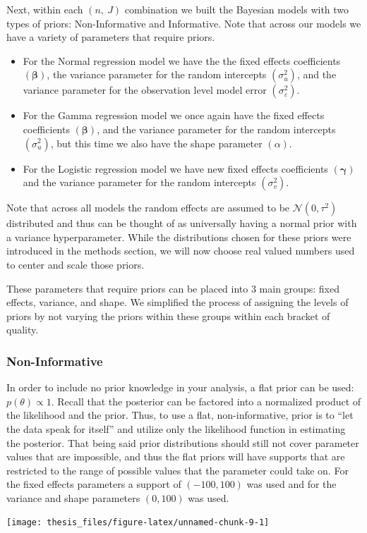 \documentclass[12pt,twoside]{reedthesis}
\begin{document}
Next, within each \((n,\ J)\) combination we built the Bayesian models with two types of priors: Non-Informative and Informative. Note that across our models we have a variety of parameters that require priors.
\begin{itemize}
\item
  For the Normal regression model we have the the fixed effects coefficients \((\boldsymbol{\beta})\), the variance parameter for the random intercepts \((\sigma_u^2)\), and the variance parameter for the observation level model error \((\sigma_{\varepsilon}^2)\).
\item
  For the Gamma regression model we once again have the fixed effects coefficients \((\boldsymbol{\beta})\), and the variance parameter for the random intercepts \((\sigma_u^2)\), but this time we also have the shape parameter \((\alpha)\).
\item
  For the Logistic regression model we have new fixed effects coefficients \((\boldsymbol{\gamma})\) and the variance parameter for the random intercepts \((\sigma_v^2)\).
\end{itemize}
Note that across all models the random effects are assumed to be \(\mathcal{N}(0, \tau^2)\) distributed and thus can be thought of as universally having a normal prior with a variance hyperparameter. While the distributions chosen for these priors were introduced in the methods section, we will now choose real valued numbers used to center and scale those priors.

These parameters that require priors can be placed into 3 main groups: fixed effects, variance, and shape. We simplified the process of assigning the levels of priors by not varying the priors within these groups within each bracket of quality.

\hypertarget{non-informative}{%
\subsubsection{Non-Informative}\label{non-informative}}

In order to include no prior knowledge in your analysis, a flat prior can be used: \(p(\theta) \propto 1\). Recall that the posterior can be factored into a normalized product of the likelihood and the prior. Thus, to use a flat, non-informative, prior is to ``let the data speak for itself'' and utilize only the likelihood function in estimating the posterior. That being said prior distributions should still not cover parameter values that are impossible, and thus the flat priors will have supports that are restricted to the range of possible values that the parameter could take on. For the fixed effects parameters a support of \((-100, 100)\) was used and for the variance and shape parameters \((0, 100)\) was used.
\begin{center}\texttt{[image: thesis\_files/figure-latex/unnamed-chunk-9-1]} \end{center}
\end{document}
